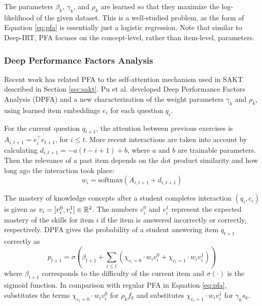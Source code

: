 The parameters $\beta_k$, $\gamma_k$, and $\rho_k$ are learned so that they maximize the log-likelihood of the given dataset. This is a well-studied problem, as the form of Equation \ref{eq:pfa} is essentially just a logistic regression. Note that similar to Deep-IRT, PFA focuses on the concept-level, rather than item-level, parameters. 

\subsubsection{Deep Performance Factors Analysis}
Recent work has related PFA to the self-attention mechanism used in SAKT described in Section \ref{sec:sakt}. Pu et al. \cite{deep_pfa} developed Deep Performance Factors Analysis (DPFA) and a new characterization of the weight parameters $\gamma_k$ and $\rho_k$, using learned item embeddings $e_i$ for each question $q_i$.

For the current question $q_{t+1}$, the attention between previous exercises is $A_{i,t+1} = e_i^\top e_{t+1}$, for $i \leq t$. More recent interactions are taken into account by calculating $d_{i,t+1} = -a(t-i+1)+b$, where $a$ and $b$ are trainable parameters. Then the relevance of a past item depends on the dot product similarity and how long ago the interaction took place:
\begin{equation}
  w_i = \text{softmax}(A_{i,t+1} + d_{i,t+1})
  \label{eq:time_bias_attn}
\end{equation}

The mastery of knowledge concepts after a student completes interaction $(q_i, c_i)$ is given as $v_i = [v_i^0, v_i^1] \in \mathbb{R}^2$. The numbers $v_i^0$ and $v_i^1$ represent the expected mastery of the skills for item $i$ if the item is answered incorrectly or correctly, respectively. DPFA gives the probability of a student answering item $q_{t+1}$ correctly as
\begin{equation}
  p_{t+1} = \sigma\left( \beta_{t+1} + \sum_{i \leq t} \left( \chi_{c_i=0}\cdot w_i v_i^0 + \chi_{c_i=1} \cdot w_i v_i^1 \right) \right)
  \label{eq:dpfa}
\end{equation}
where $\beta_{t+1}$ corresponds to the difficulty of the current item and $\sigma(\cdot)$ is the sigmoid function. In comparison with regular PFA in Equation \ref{eq:pfa}, substitutes the terms $\chi_{c_i=0}\cdot w_i v_i^0$ for $\rho_k f_k$ and substitutes $\chi_{c_i=1} \cdot w_i v_i^1$ for $\gamma_k s_k$.
